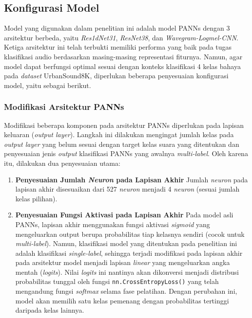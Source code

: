 \subsection{Konfigurasi Model}
Model yang digunakan dalam penelitian ini adalah model PANNs \cite{kong2020panns} dengan 3 arsitektur berbeda, yaitu \textit{Res1dNet31}, \textit{ResNet38}, dan \textit{Wavegram-Logmel-CNN}.
Ketiga arsitektur ini telah terbukti memiliki performa yang baik pada tugas klasifikasi audio berdasarkan masing-masing representasi fiturnya.
Namun, agar model dapat berfungsi optimal sesuai dengan konteks klasifikasi 4 kelas bahaya pada \textit{dataset} UrbanSound8K, diperlukan beberapa penyesuaian konfigurasi model, yaitu sebagai berikut. \par

\subsubsection{Modifikasi Arsitektur PANNs}
Modifikasi beberapa komponen pada arsitektur PANNs diperlukan pada lapisan keluaran (\textit{output layer}). 
Langkah ini dilakukan mengingat jumlah kelas pada \textit{output layer} yang belum sesuai dengan target kelas suara yang ditentukan dan penyesuaian jenis \textit{output} klasifikasi PANNs yang awalnya \textit{multi-label}.
Oleh karena itu, dilakukan dua penyesuaian utama:
\begin{enumerate}
    \item \textbf{Penyesuaian Jumlah \textit{Neuron} pada Lapisan Akhir} \newline
    Jumlah \textit{neuron} pada lapisan akhir disesuaikan dari 527 \textit{neuron} menjadi 4 \textit{neuron} (sesuai jumlah kelas pilihan).
    \item \textbf{Penyesuaian Fungsi Aktivasi pada Lapisan Akhir} \newline
    Pada model asli PANNs, lapisan akhir menggunakan fungsi aktivasi \textit{sigmoid} yang mengeluarkan output berupa probabilitas tiap kelasnya sendiri (cocok untuk \textit{multi-label}).
    Namun, klasifikasi model yang ditentukan pada penelitian ini adalah klasifikasi \textit{single-label}, sehingga terjadi modifikasi pada lapisan akhir pada arsitektur model menjadi lapisan \textit{linear} yang mengeluarkan angka mentah (\textit{logits}).
    Nilai \textit{logits} ini nantinya akan dikonversi menjadi distribusi probabilitas tunggal oleh fungsi \texttt{nn.CrossEntropyLoss()} yang telah mengandung fungsi \textit{softmax} selama fase pelatihan.
    Dengan perubahan ini, model akan memilih satu kelas pemenang dengan probabilitas tertinggi daripada kelas lainnya. \par
\end{enumerate}

